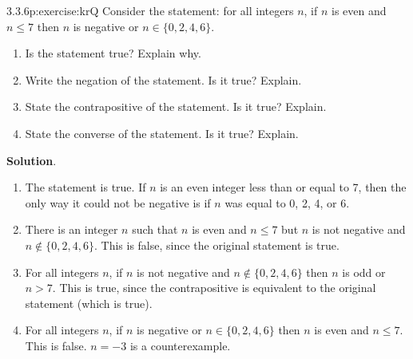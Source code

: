 \documentclass[twoside,11pt,]{book}
\newcommand{\blocktitlefont}{\relax}
\numberwithin{equation}{chapter}
\begin{document}
\begin{divisionsolution}{3.3.6}{}{p:exercise:krQ}%
Consider the statement: for all integers \(n\), if \(n\) is even and \(n \le 7\) then \(n\) is negative or \(n \in \{0,2,4,6\}\).%
\begin{enumerate}[label=(\alph*)]
\item{}Is the statement true? Explain why.%
\item{}Write the negation of the statement. Is it true? Explain.%
\item{}State the contrapositive of the statement. Is it true? Explain.%
\item{}State the converse of the statement. Is it true? Explain.%
\end{enumerate}
%
\par\smallskip%
\noindent\textbf{\blocktitlefont Solution}.\quad{}%
\begin{enumerate}[label=(\alph*)]
\item{}The statement is true. If \(n\) is an even integer less than or equal to 7, then the only way it could not be negative is if \(n\) was equal to 0, 2, 4, or 6.%
\item{}There is an integer \(n\) such that \(n\) is even and \(n \le 7\) but \(n\) is not negative and \(n \not\in \{0,2,4,6\}\). This is false, since the original statement is true.%
\item{}For all integers \(n\), if \(n\) is not negative and \(n \not\in\{0,2,4,6\}\) then \(n\) is odd or \(n > 7\). This is true, since the contrapositive is equivalent to the original statement (which is true).%
\item{}For all integers \(n\), if \(n\) is negative or \(n \in \{0,2,4,6\}\) then \(n\) is even and \(n \le 7\). This is false. \(n = -3\) is a counterexample.%
\end{enumerate}
%
\end{divisionsolution}%
\end{document}
